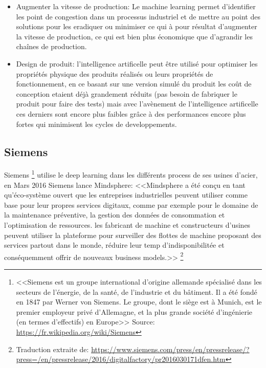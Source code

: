 \begin{itemize}
            \item Augmenter la vitesse de production: Le machine learning permet d'identifier les point 
            de congestion dans un processus industriel et de mettre au point des solutions pour les eradiquer 
            ou minimiser ce qui à pour résultat d'augmenter la vitesse de production, ce qui est bien 
            plus économique que d'agrandir les chaînes de production. \newline 

            \item Design de produit: l'intelligence artificelle peut être utilisé pour optimiser les propriétés 
            physique des produits réalisés ou leurs propriétés de fonctionnement, en ce basant sur une
            version simulé du produit les coût de conception etaient déjà grandement réduits 
            (pas besoin de fabriquer le produit pour faire des tests) mais avec l'avènement de 
            l'intelligence artificelle ces derniers sont encore plus faibles grâce à des performances
            encore plus fortes qui minimisent les cycles de developpements.
            \newline
        \end{itemize}

        \subsection{Siemens}
            Siemens \footnote{<<Siemens est un groupe 
            international d’origine allemande spécialisé dans les secteurs de l'énergie, 
            de la santé, de l'industrie et du bâtiment. 
            Il a été fondé en 1847 par Werner von Siemens. 
            Le groupe, dont le siège est à Munich, est le premier employeur privé d'Allemagne, 
            et la plus grande société d'ingénierie (en termes d'effectifs) en Europe>> 
            Source: \url{https://fr.wikipedia.org/wiki/Siemens}}
            utilise le deep learning dans les différents process de ses usines d'acier,
            en Mars 2016 Siemens lance Mindsphere: 
            <<Mindsphere a été conçu en tant qu'éco-système ouvert que les entreprises industrielles
            peuvent utiliser comme base pour leur propres services digitaux, comme par exemple pour 
            le domaine de la maintenance préventive, la gestion des données de consommation et 
            l'optimisation de ressources. les fabricant de machine et constructeurs d'usines
            peuvent utiliser la plateforme pour surveiller des flottes de machine proposant des
            services partout dans le monde, réduire leur temp d'indisponibilitée et 
            conséquemment offrir de nouveaux business models.>> 
            \footnote{Traduction extraite de: \url{https://www.siemens.com/press/en/pressrelease/?press=/en/pressrelease/2016/digitalfactory/pr2016030171dfen.htm}}
            \newline

